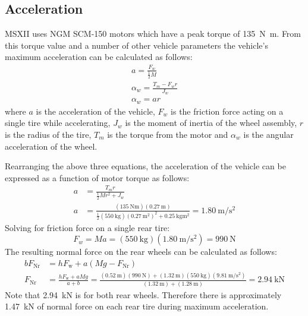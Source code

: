 \documentclass[10pt]{article}
\begin{document}
\subsection{Acceleration}
MSXII uses NGM SCM-150 motors which have a peak torque of \SI{135}{\newton\metre}. From this torque value and a number of other vehicle parameters the vehicle's maximum acceleration can be calculated as follows: 
\begin{gather}
a = \frac{F_w}{\frac{1}{2}M} \\
\alpha_w = \frac{T_m - F_wr}{J_w} \\
\alpha_w = ar
\end{gather}
where $a$ is the acceleration of the vehicle, $F_w$ is the friction force acting on a single tire while accelerating, $J_w$ is the moment of inertia of the wheel assembly, $r$ is the radius of the tire, $T_m$ is the torque from the motor and $\alpha_w$ is the angular acceleration of the wheel. 

Rearranging the above three equations, the acceleration of the vehicle can be expressed as a function of motor torque as follows: 
\begin{equation}
\begin{split}
a &= \frac{T_m r}{\frac{1}{2}Mr^2 + J_w} \\
a &= \frac{(\SI{135}{\newton\metre})(\SI{0.27}{\metre})}{\frac{1}{2}(\SI{550}{\kilo\gram})(\SI{0.27}{\metre\squared})^2 + \SI{0.25}{\kilo\gram\metre\squared}} = \SI{1.80}{\metre\per\second\squared}
\end{split}
\end{equation}
Solving for friction force on a single rear tire: 
\begin{equation}
F_w = Ma = (\SI{550}{\kilo\gram})(\SI{1.80}{\metre\per\second\squared}) = \SI{990}{\newton}
\end{equation}
The resulting normal force on the rear wheels can be calculated as follows: 
\begin{equation}
\begin{split}
bF_\mathrm{Nr} &= hF_\mathrm{w} + a(Mg - F_\mathrm{Nr})\\
F_\mathrm{Nr} &= \frac{hF_\mathrm{w} + aMg}{a+b} = \frac{(\SI{0.52}{\metre})(\SI{990}{\newton})+(\SI{1.32}{\metre})(\SI{550}{\kilo\gram})\left(\SI{9.81}{\metre\per\second\squared}\right)}{(\SI{1.32}{\metre})+(\SI{1.28}{\metre})} = \SI{2.94}{\kilo\newton}
\end{split}
\end{equation}
Note that \SI{2.94}{\kilo\newton} is for both rear wheels. Therefore there is approximately \SI{1.47}{\kilo\newton} of normal force on each rear tire during maximum acceleration.
\end{document}
